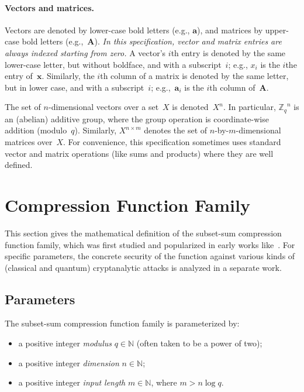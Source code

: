 \documentclass[11pt]{article}
\newcommand{\N}{\ensuremath{\mathbb{N}}}
\newcommand{\Z}{\ensuremath{\mathbb{Z}}}
\newcommand{\Zq}{\ensuremath{\Z_q}}
\newcommand{\matA}{\ensuremath{\mathbf{A}}}
\newcommand{\veca}{\ensuremath{\mathbf{a}}}
\newcommand{\vecx}{\ensuremath{\mathbf{x}}}
\numberwithin{equation}{section}
\begin{document}
\paragraph{Vectors and matrices.}

Vectors are denoted by lower-case bold letters (e.g., $\veca$), and
matrices by upper-case bold letters (e.g.,~$\matA$). \emph{In this
  specification, vector and matrix entries are always indexed starting
  from zero.} A vector's $i$th entry is denoted by the same lower-case
letter, but without boldface, and with a subscript~$i$; e.g., $x_{i}$
is the $i$the entry of~$\vecx$. Similarly, the $i$th column of a
matrix is denoted by the same letter, but in lower case, and with a
subscript~$i$; e.g.,~$\veca_{i}$ is the $i$th column of~$\matA$.

The set of $n$-dimensional vectors over a set~$X$ is
denoted~$X^{n}$. In particular, $\Zq^{n}$ is an (abelian) additive
group, where the group operation is coordinate-wise addition
(modulo~$q$). Similarly, $X^{n \times m}$ denotes the set of
$n$-by-$m$-dimensional matrices over~$X$. For convenience, this
specification sometimes uses standard vector and matrix operations
(like sums and products) where they are well defined.





\section{Compression Function Family}
\label{sec:function}

This section gives the mathematical definition of the subset-sum
compression function family, which was first studied and popularized
in early works
like~\cite{DBLP:journals/joc/ImpagliazzoN96,ajtai04:_gener_hard_instan_lattic_probl}. For
specific parameters, the concrete security of the function against
various kinds of (classical and quantum) cryptanalytic attacks is
analyzed in a separate work.

\subsection{Parameters}
\label{sec:parameters}

The subset-sum compression function family is parameterized by:
\begin{itemize}
\item a positive integer \emph{modulus} $q \in \N$ (often taken to be
  a power of two);
\item a positive integer \emph{dimension} $n \in \N$;
\item a positive integer \emph{input length} $m \in \N$, where $m > n
  \log q$.
\end{itemize}
\end{document}
